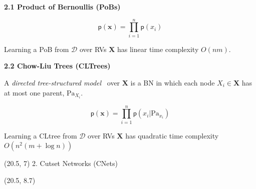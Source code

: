 \documentclass[final]{beamer}
\begin{document}
\begin{frame}{}
\begin{textblock}{17.5}
    
    {\bf 2.1 Product of Bernoullis (PoBs)}

    
    $$\mathsf{p}(\mathbf{x}) =\prod_{i=1}^{n}\mathsf{p}(x_{i})$$

    Learning a PoB from $\mathcal{D}$ over RVs $\mathbf{X}$ has linear
    time complexity $O(nm)$.

    {\bf 2.2 Chow-Liu Trees (CLTrees)}

    A \emph{directed tree-structured model}~\cite{Meila2000} over
    $\mathbf{X}$ is a BN in which each node $X_{i}\in\mathbf{X}$ has at most one
    parent, $\mathrm{Pa}_{X_i}$.

    $$\mathsf{p}(\mathbf{x}) =
    \prod_{i=1}^n\mathsf{p}(x_i|\mathrm{Pa}_{x_i})$$

    Learning a CLtree from $\mathcal{D}$ over RVs $\mathbf{X}$ has
    quadratic time complexity
$O(n^2 (m + \log n))$
  \end{textblock}

  

  \begin{textblock}{17.5}(20.5, 7)
    2. Cutset Networks (CNets)
  \end{textblock}
  
  \begin{textblock}{17.5}(20.5, 8.7)
    \small


\end{textblock}
\end{frame}
\end{document}

